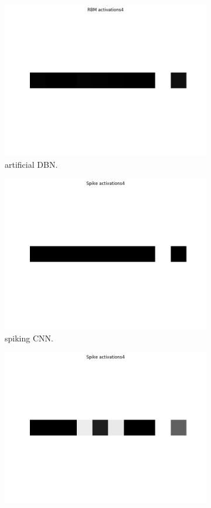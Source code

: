 \begin{figure}
	\begin{subfigure}[t]{.24\textwidth}
  		\centering
  		\includegraphics[width=.9\linewidth]{imgs/convert/rbm00004.png}
  		\caption{artificial DBN.}
  		\label{fig:sub1}
	\end{subfigure}%
	\begin{subfigure}[t]{.24\textwidth}
  		\centering
  		\includegraphics[width=.9\linewidth]{imgs/convert/cnn00004.png}
  		\caption{spiking CNN.}
  		\label{fig:sub2}
	\end{subfigure}
	\begin{subfigure}[t]{.24\textwidth}
  		\centering
  		\includegraphics[width=.9\linewidth]{imgs/convert/coba00004.png}

\end{subfigure}
\end{figure}
